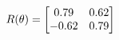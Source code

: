 \documentclass[preview]{standalone}
\begin{document}
\begin{align*}
\special{dvisvgm:raw <g id='unique000'>}R(\theta) = \begin{bmatrix}0.79 & 0.62\\-0.62 & 0.79\end{bmatrix}\special{dvisvgm:raw </g>}
\end{align*}
\end{document}
